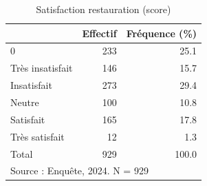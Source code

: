 \begin{table}[htbp]\centering
\def\sym#1{\ifmmode^{#1}\else\(^{#1}\)\fi}
\caption{Satisfaction restauration (score)}
\begin{tabular}{l*{2}{r}}
\toprule
            &    Effectif&Fréquence (\%)\\
\midrule
0           &         233&        25.1\\
Très insatisfait&         146&        15.7\\
Insatisfait &         273&        29.4\\
Neutre      &         100&        10.8\\
Satisfait   &         165&        17.8\\
Très satisfait&          12&         1.3\\
Total       &         929&       100.0\\
\bottomrule
\multicolumn{3}{l}{\footnotesize Source : Enquête, 2024. N = 929}\\
\end{tabular}
\end{table}
